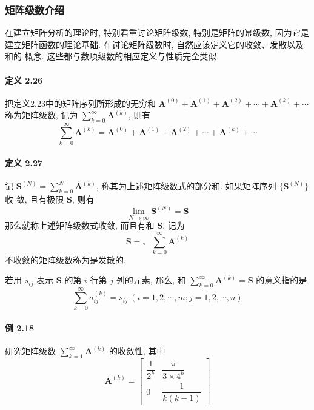 \subsubsection{矩阵级数介绍}

在建立矩阵分析的理论时, 特别看重讨论矩阵级数, 特别是矩阵的幂级数, 因为它是
建立矩阵函数的理论基础. 在讨论矩阵级数时, 自然应该定义它的收敛、发散以及和的
概念. 这些都与数项级数的相应定义与性质完全类似.

\paragraph*{定义 2.26} 把定义2.23中的矩阵序列所形成的无穷和 $\bm{A}^{(0)} + \bm{A}^{(1)} + \bm{A}^{(2)} + \cdots + \bm{A}^{(k)} + \cdots$
称为矩阵级数, 记为 $\sum\limits_{k=0}^\infty \bm{A}^{(k)}$, 则有
\begin{equation}
    \sum\limits_{k=0}^\infty \bm{A}^{(k)} = \bm{A}^{(0)} + \bm{A}^{(1)} + \bm{A}^{(2)} + \cdots + \bm{A}^{(k)} + \cdots
    \tag{2.3.1}
\end{equation}

\paragraph*{定义 2.27} 记 $\bm{S}^{(N)} = \sum\limits_{k=0}^N \bm{A}^{(k)}$, 称其为上述矩阵级数式的部分和. 如果矩阵序列 $\{\bm{S}^{(N)}\}$ 收
敛, 且有极限 $\bm{S}$, 则有
\begin{equation}
    \lim\limits_{N \to \infty} \bm{S}^{(N)} = \bm{S}
    \tag{2.3.2}
\end{equation}
那么就称上述矩阵级数式收敛, 而且有和 $\bm{S}$, 记为
\begin{equation}
    \bm{S} = 、\sum\limits_{k=0}^\infty \bm{A}^{(k)}
    \tag{2.3.3}
\end{equation}
不收敛的矩阵级数称为是发散的.

\par 若用 $s_{ij}$ 表示 $\bm{S}$ 的第 $i$ 行第 $j$ 列的元素, 那么, 和 $\sum\limits_{k = 0}^\infty \bm{A}^{(k)} = \bm{S}$ 的意义指的是
\begin{equation}
    \sum\limits_{k = 0}^\infty a_{ij}^{(k)} = s_{ij} \ (i = 1, 2, \cdots, m; j = 1, 2, \cdots, n)
    \tag{2.3.4}
\end{equation}

\paragraph*{例 2.18} 研究矩阵级数 $\sum\limits_{k = 1}^\infty \bm{A}^{(k)}$ 的收敛性, 其中
$$
    \bm{A}^{(k)} = \begin{bmatrix}
        \dfrac{1}{2^k} & \dfrac{\pi}{3 \times 4^k} \\
        0              & \dfrac{1}{k(k + 1)}
    \end{bmatrix}
$$

